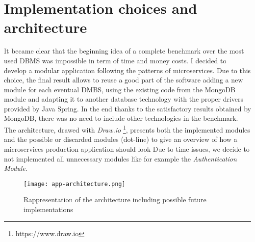 \section{Implementation choices and architecture}
\label{sec:2}
It became clear that the beginning idea of a complete benchmark over the most used DBMS was impossible in term of time and money costs.
I decided to develop a modular application following the patterns of microservices. Due to this choice, the final result allows to reuse a good part of the software  adding a new module for each eventual DMBS, using the existing code from the MongoDB module and adapting it to another database technology with the proper drivers provided by Java Spring.
In the end thanks to the satisfactory results obtained by MongoDB, there was no need to include other technologies in the benchmark.
\newpage
The architecture, drawed with \textit{Draw.io} \footnote{https://www.draw.io}, presents  both the implemented modules and the possible or discarded modules (dot-line) to give an overview of how a microservices production application should look
Due to time issues, we decide to not implemented all unnecessary modules like for example the \textit{Authentication Module}.
\begin{figure}
\texttt{[image: app-architecture.png]}
\centering
\caption{Rappresentation of the architecture including possible future implementations}
\end{figure}



